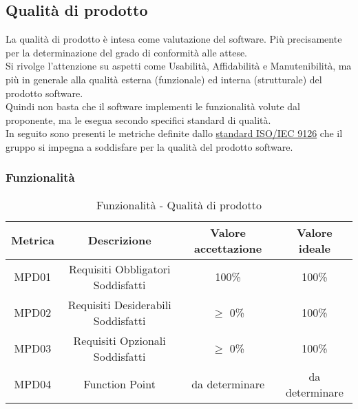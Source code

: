 \documentclass[10pt]{article}
\begin{document}
\begin{justify}
\subsection{Qualità di prodotto}\label{qpd}
La qualità di prodotto è intesa come valutazione del software. Più precisamente per la determinazione del grado di conformità alle attese.\\
Si rivolge l'attenzione su aspetti come Usabilità, Affidabilità e Manutenibilità, ma più in generale alla qualità esterna (funzionale) ed interna (strutturale) del prodotto software.\\
Quindi non basta che il software implementi le funzionalità volute dal proponente, ma le esegua secondo specifici standard di qualità.\\
In seguito sono presenti le metriche definite dallo \hyperref[ISO 9126]{standard ISO/IEC 9126} che il gruppo si impegna a soddisfare per la qualità del prodotto software.
\subsubsection{Funzionalità}
\begin{table}[H]
  \centering
\begin{tabular}{|c|c|c|c|}
  \hline
  \textbf{Metrica} & \textbf{Descrizione} & \textbf{Valore accettazione} & \textbf{Valore ideale}\\
  \hline
  MPD01 & Requisiti Obbligatori Soddisfatti & 100\% & 100\%\\
  \hline
  MPD02 & Requisiti Desiderabili Soddisfatti  & $\geq$ 0\% & 100\% \\
  \hline
  MPD03 & Requisiti Opzionali Soddisfatti & $\geq$ 0\% & 100\% \\
  \hline
  MPD04 & Function Point & da determinare & da determinare \\ 
  \hline
\end{tabular}
\caption{Funzionalità - Qualità di prodotto}
\label{tab:funzionalità}
\end{table}



\end{justify}
\end{document}
